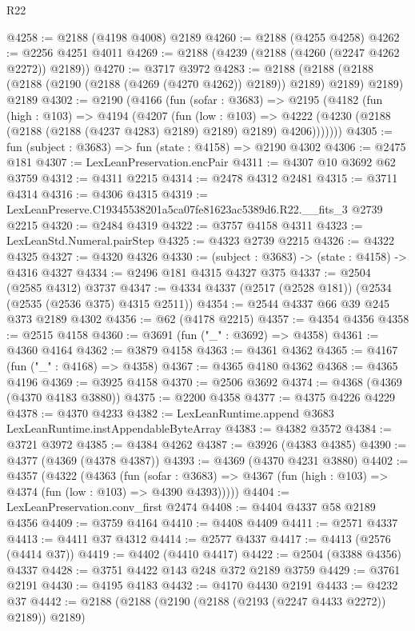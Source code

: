\begin{lexlean}{R22}
\begin{coremodule}
@4258 := @2188 (@4198 @4008) @2189
@4260 := @2188 (@4255 @4258)
@4262 := @2256 @4251 @4011
@4269 := @2188 (@4239 (@2188 (@4260 (@2247 @4262 @2272)) @2189))
@4270 := @3717 @3972
@4283 := @2188
    (@2188 (@2188 (@2188 (@2190 (@2188 (@4269 (@4270 @4262)) @2189)) @2189) @2189) @2189)
    @2189
@4302 := @2190
    (@4166
      (fun (sofar : @3683) =>
      @2195
        (@4182
          (fun (high : @103) =>
          @4194
            (@4207
              (fun (low : @103) =>
              @4222 (@4230 (@2188 (@2188 (@2188 (@4237 @4283) @2189) @2189) @2189) @4206)))))))
@4305 := fun (subject : @3683) => fun (state : @4158) => @2190 @4302
@4306 := @2475 @181
@4307 := LexLeanPreservation.encPair
@4311 := @4307 @10 @3692 @62 @3759
@4312 := @4311 @2215
@4314 := @2478 @4312 @2481
@4315 := @3711 @4314
@4316 := @4306 @4315
@4319 := LexLeanPreserve.C19345538201a5ca07fe81623ac5389d6.R22.__fits_3 @2739 @2215
@4320 := @2484 @4319
@4322 := @3757 @4158 @4311
@4323 := LexLeanStd.Numeral.pairStep
@4325 := @4323 @2739 @2215
@4326 := @4322 @4325
@4327 := @4320 @4326
@4330 := (subject : @3683) -> (state : @4158) -> @4316 @4327
@4334 := @2496 @181 @4315 @4327 @375
@4337 := @2504 (@2585 @4312) @3737
@4347 := @4334 @4337 (@2517 (@2528 @181)) (@2534 (@2535 (@2536 @375) @4315 @2511))
@4354 := @2544 @4337 @66 @39 @245 @373 @2189 @4302
@4356 := @62 (@4178 @2215)
@4357 := @4354 @4356
@4358 := @2515 @4158
@4360 := @3691 (fun ("_" : @3692) => @4358)
@4361 := @4360 @4164
@4362 := @3879 @4158
@4363 := @4361 @4362
@4365 := @4167 (fun ("_" : @4168) => @4358)
@4367 := @4365 @4180 @4362
@4368 := @4365 @4196
@4369 := @3925 @4158
@4370 := @2506 @3692
@4374 := @4368 (@4369 (@4370 @4183 @3880))
@4375 := @2200 @4358
@4377 := @4375 @4226 @4229
@4378 := @4370 @4233
@4382 := LexLeanRuntime.append @3683 LexLeanRuntime.instAppendableByteArray
@4383 := @4382 @3572
@4384 := @3721 @3972
@4385 := @4384 @4262
@4387 := @3926 (@4383 @4385)
@4390 := @4377 (@4369 (@4378 @4387))
@4393 := @4369 (@4370 @4231 @3880)
@4402 := @4357
    (@4322
      (@4363
        (fun (sofar : @3683) =>
        @4367 (fun (high : @103) => @4374 (fun (low : @103) => @4390 @4393)))))
@4404 := LexLeanPreservation.conv_first @2474
@4408 := @4404 @4337 @58 @2189 @4356
@4409 := @3759 @4164
@4410 := @4408 @4409
@4411 := @2571 @4337
@4413 := @4411 @37 @4312
@4414 := @2577 @4337
@4417 := @4413 (@2576 (@4414 @37))
@4419 := @4402 (@4410 @4417)
@4422 := @2504 (@3388 @4356) @4337
@4428 := @3751 @4422 @143 @248 @372 @2189 @3759
@4429 := @3761 @2191
@4430 := @4195 @4183
@4432 := @4170 @4430 @2191
@4433 := @4232 @37
@4442 := @2188 (@2188 (@2190 (@2188 (@2193 (@2247 @4433 @2272)) @2189)) @2189)

\end{coremodule}
\end{lexlean}
